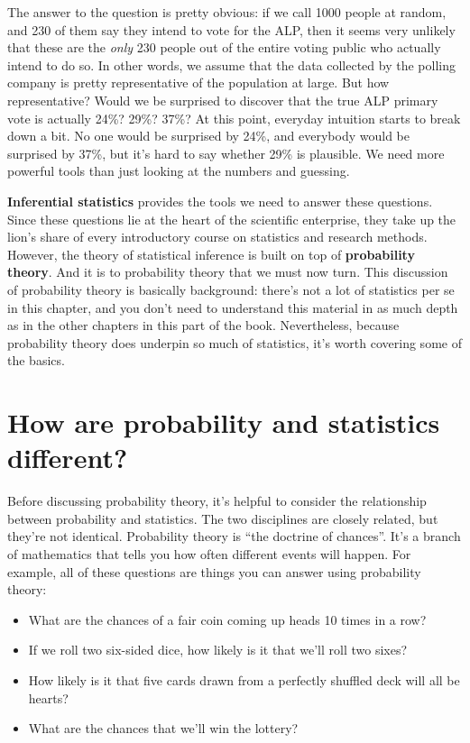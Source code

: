 \documentclass[
  11pt,
  a4paper,
  twoside,symmetric,openright]{book}
\providecommand{\tightlist}{%
  \setlength{\itemsep}{0pt}\setlength{\parskip}{0pt}}
\theoremstyle{break}
\theoremstyle{break}
\begin{document}
The answer to the question is pretty obvious: if we call 1000 people at random, and 230 of them say they intend to vote for the ALP, then it seems very unlikely that these are the \emph{only} 230 people out of the entire voting public who actually intend to do so. In other words, we assume that the data collected by the polling company is pretty representative of the population at large. But how representative? Would we be surprised to discover that the true ALP primary vote is actually 24\%? 29\%? 37\%? At this point, everyday intuition starts to break down a bit. No one would be surprised by 24\%, and everybody would be surprised by 37\%, but it's hard to say whether 29\% is plausible. We need more powerful tools than just looking at the numbers and guessing.

\textbf{Inferential statistics} provides the tools we need to answer these questions. Since these questions lie at the heart of the scientific enterprise, they take up the lion's share of every introductory course on statistics and research methods. However, the theory of statistical inference is built on top of \textbf{probability theory}. And it is to probability theory that we must now turn. This discussion of probability theory is basically background: there's not a lot of statistics per se in this chapter, and you don't need to understand this material in as much depth as in the other chapters in this part of the book. Nevertheless, because probability theory does underpin so much of statistics, it's worth covering some of the basics.

\section{How are probability and statistics different?}\label{probabilitystats}

Before discussing probability theory, it's helpful to consider the relationship between probability and statistics. The two disciplines are closely related, but they're not identical. Probability theory is ``the doctrine of chances''. It's a branch of mathematics that tells you how often different events will happen. For example, all of these questions are things you can answer using probability theory:

\begin{itemize}
\tightlist
\item
  What are the chances of a fair coin coming up heads 10 times in a row?
\item
  If we roll two six-sided dice, how likely is it that we'll roll two sixes?
\item
  How likely is it that five cards drawn from a perfectly shuffled deck will all be hearts?
\item
  What are the chances that we'll win the lottery?
\end{itemize}
\end{document}
